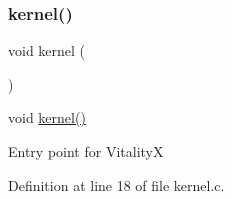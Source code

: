 \subsubsection{\texorpdfstring{kernel()}{kernel()}}
{\footnotesize\ttfamily void kernel (\begin{DoxyParamCaption}{ }\end{DoxyParamCaption})}



void \hyperlink{a00011_aadb4d5397feda84ee5ee39b33082faca_aadb4d5397feda84ee5ee39b33082faca}{kernel()} 

Entry point for VitalityX 

Definition at line 18 of file kernel.\+c.

